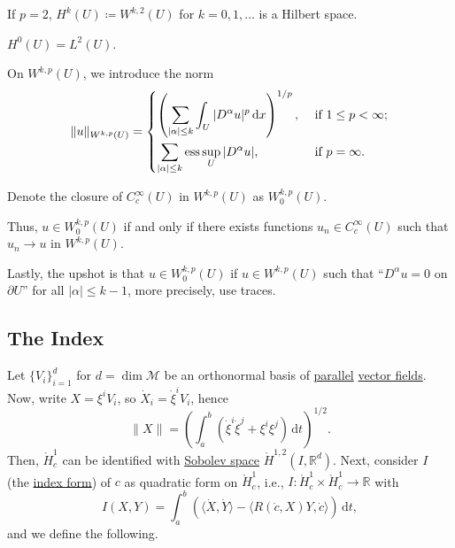 \begin{remark}
	If \(p = 2\), \(H^k(U) \coloneqq W^{k, 2}(U)\) for \(k = 0, 1, \dots \) is a Hilbert space.
\end{remark}

\begin{eg}
	\(H^0(U) = L^2(U)\).
\end{eg}

On \(W^{k, p}(U)\), we introduce the norm
\[
	\lVert u \rVert_{W^{k, p}(U)} = \begin{dcases}
		\left( \sum_{\vert \alpha \vert \leq k} \int _U \vert D^\alpha u \vert ^p \,\mathrm{d} x \right)^{1 / p} , & \text{ if } 1 \leq p < \infty ; \\
		\sum_{\vert \alpha \vert \leq k} \mathrm{ess} \sup _U \vert D^\alpha u \vert ,                             & \text{ if } p = \infty .
	\end{dcases}
\]

\begin{notation}
	Denote the closure of \(C_c^{\infty} (U)\) in \(W^{k, p}(U)\) as \(W_0^{k, p}(U)\).
\end{notation}

Thus, \(u\in W_0^{k, p}(U)\) if and only if there exists functions \(u_n \in C_c^{\infty} (U)\) such that \(u_n \to u\) in \(W^{k, p}(U)\).

\begin{remark}
	Lastly, the upshot is that \(u\in W^{k, p}_0(U)\) if \(u\in W^{k, p}(U)\) such that ``\(D^\alpha u=0\) on \(\partial U\)'' for all \(\vert \alpha \vert \leq k - 1\), more precisely, use traces.
\end{remark}

\subsection{The Index}
Let \(\{ V_i \} _{i=1}^d\) for \(d = \dim \mathcal{M} \) be an orthonormal basis of \hyperref[def:parallel]{parallel} \hyperref[def:vector-field]{vector fields}. Now, write \(X = \xi ^i V_i\), so \(\dot{X} _i = \dot{\xi }^i V_i \), hence
\[
	\lVert X \rVert = \left( \int_{a}^{b} \left( \dot{\xi }^i \dot{\xi }^j + \xi ^i \xi ^j \right)  \,\mathrm{d}t \right) ^{1 / 2}.
\]
Then, \(\mathring{H}_c^1\) can be identified with \hyperref[def:Sobolev-space]{Sobolev space} \(\mathring{H}^{1, 2}(I, \mathbb{R} ^d)\). Next, consider \(I\) (the \hyperref[def:index-form]{index form}) of \(c\) as quadratic form on \(\mathring{H}^1_c \), i.e., \(I\colon \mathring{H}^1_c \times \mathring{H}^1_c \to \mathbb{R} \) with
\[
	I(X, Y) = \int_{a}^{b} \left( \langle \dot{X} , \dot{Y} \rangle - \langle R(\dot{c} , X) Y, \dot{c}  \rangle \right)  \,\mathrm{d}t,
\]
and we define the following.

